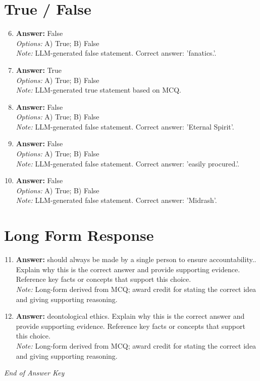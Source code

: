 \documentclass[12pt]{article}
\begin{document}
\section*{True / False}
\begin{enumerate}[label=\arabic*.]
\setcounter{enumi}{5}
\item \textbf{Answer:} False
\\ \textit{Options:} A) True; B) False
\\ \textit{Note:} LLM-generated false statement. Correct answer: 'fanatics.'.
\item \textbf{Answer:} True
\\ \textit{Options:} A) True; B) False
\\ \textit{Note:} LLM-generated true statement based on MCQ.
\item \textbf{Answer:} False
\\ \textit{Options:} A) True; B) False
\\ \textit{Note:} LLM-generated false statement. Correct answer: 'Eternal Spirit'.
\item \textbf{Answer:} False
\\ \textit{Options:} A) True; B) False
\\ \textit{Note:} LLM-generated false statement. Correct answer: 'easily procured.'.
\item \textbf{Answer:} False
\\ \textit{Options:} A) True; B) False
\\ \textit{Note:} LLM-generated false statement. Correct answer: 'Midrash'.
\end{enumerate}

\section*{Long Form Response}
\begin{enumerate}[label=\arabic*.]
\setcounter{enumi}{10}
\item \textbf{Answer:} should always be made by a single person to ensure accountability.. Explain why this is the correct answer and provide supporting evidence. Reference key facts or concepts that support this choice.
\\ \textit{Note:} Long-form derived from MCQ; award credit for stating the correct idea and giving supporting reasoning.
\item \textbf{Answer:} deontological ethics. Explain why this is the correct answer and provide supporting evidence. Reference key facts or concepts that support this choice.
\\ \textit{Note:} Long-form derived from MCQ; award credit for stating the correct idea and giving supporting reasoning.
\end{enumerate}

\vfill
\noindent\textit{End of Answer Key}
\end{document}
